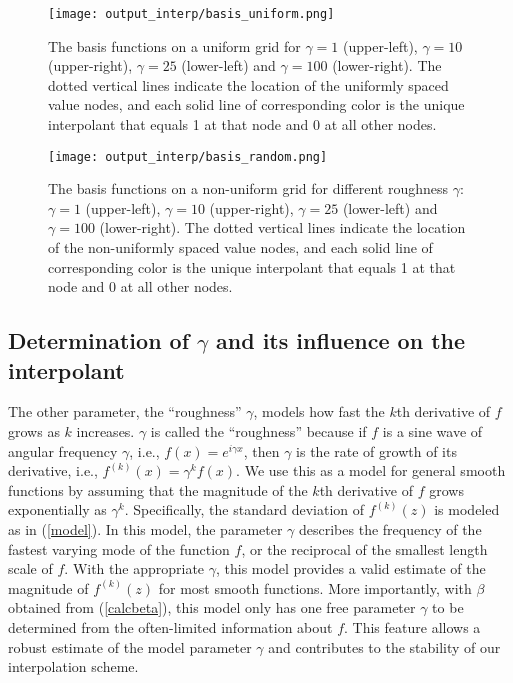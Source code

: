 \begin{figure}[htb!] \centering
\texttt{[image: output\_interp/basis\_uniform.png]}
\caption{The basis functions on a uniform grid for 
$\gamma=1$ (upper-left), $\gamma=10$ (upper-right),
$\gamma=25$ (lower-left) and $\gamma=100$ (lower-right).
The dotted vertical lines indicate the location of the uniformly spaced
value nodes, and each solid line of corresponding color is the unique
interpolant that equals 1 at that node and 0 at all other nodes. }
\label{basis_uniform}
\end{figure}
\begin{figure}[htb!] \centering
\texttt{[image: output\_interp/basis\_random.png]}
\caption{The basis functions on a non-uniform grid for different roughness
$\gamma$: $\gamma=1$ (upper-left), $\gamma=10$ (upper-right),
$\gamma=25$ (lower-left) and $\gamma=100$ (lower-right).
The dotted vertical lines indicate the location of the non-uniformly spaced
value nodes, and each solid line of corresponding color is the unique
interpolant that equals 1 at that node and 0 at all other nodes. }
\label{basis_random}
\end{figure}

\subsection{Determination of $\gamma$ and its influence on
            the interpolant} \label{s:gamma}

The other parameter, the ``roughness'' $\gamma$, models
how fast the $k$th derivative of $f$ grows as $k$ increases.
$\gamma$ is called the ``roughness'' because if $f$ is a sine wave of angular
frequency $\gamma$, i.e., $f(x) = e^{i\gamma x}$, then $\gamma$ is the rate of
growth of its derivative, i.e., $f^{(k)}(x) = \gamma^k f(x)$.
We use this as a model for general smooth functions by assuming that the
magnitude of the $k$th derivative of $f$ grows exponentially as $\gamma^k$.
Specifically, the standard deviation of $f^{(k)}(z)$ is modeled as in
(\ref{model}).  In this model, the parameter $\gamma$  describes the frequency
of the fastest varying mode of the function $f$, or the reciprocal of the
smallest length scale of $f$.
With the appropriate $\gamma$, this model provides a valid estimate
of the magnitude of $f^{(k)}(z)$ for most smooth functions.  More importantly,
with $\beta$ obtained from (\ref{calcbeta}), this model
only has one free parameter $\gamma$ to be determined from the often-limited
information about $f$.  This feature allows a robust estimate of the model
parameter $\gamma$ and contributes to the stability of our interpolation scheme.

